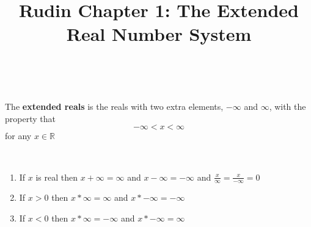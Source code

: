 \documentclass{article}
\title{Rudin Chapter 1: The Extended Real Number System}
\begin{document}
\maketitle


\begin{definition}
\

The \textbf{extended reals} is the reals with two extra elements, $-\infty$ and $\infty$, with the property that $$-\infty < x < \infty$$for any $x \in \mathbb{R}$ 
\end{definition}

\begin{definition}
\

\begin{enumerate}
    \item If $x$ is real then $x + \infty  = \infty$ and $x - \infty  = -\infty$ and $\frac{x}{\infty} = \frac{x}{-\infty} = 0$
    \item If $x>0$ then $x*\infty = \infty$ and $x * -\infty  = -\infty$
    \item If $x < 0$ then $x*\infty = -\infty$ and $x * -\infty = \infty$
\end{enumerate}
\end{definition}
\end{document}
